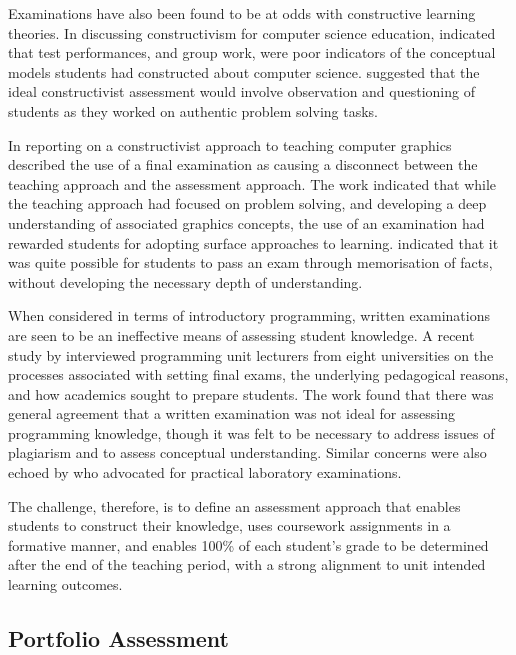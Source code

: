 Examinations have also been found to be at odds with constructive learning theories. In discussing constructivism for computer science education, \citet{BenAri:2001} indicated that test performances, and group work, were poor indicators of the conceptual models students had constructed about computer science. \citet{BenAri:2001} suggested that the ideal constructivist assessment would involve observation and questioning of students as they worked on authentic problem solving tasks.

In reporting on a constructivist approach to teaching computer graphics \citet{Taxen:2004} described the use of a final examination as causing a disconnect between the teaching approach and the assessment approach. The work indicated that while the teaching approach had focused on problem solving, and developing a deep understanding of associated graphics concepts, the use of an examination had rewarded students for adopting surface approaches to learning. \citet{Taxen:2004} indicated that it was quite possible for students to pass an exam through memorisation of facts, without developing the necessary depth of understanding.

When considered in terms of introductory programming, written examinations are seen to be an ineffective means of assessing student knowledge. A recent study by \citet{Sheard:2013} interviewed programming unit lecturers from eight universities on the processes associated with setting final exams, the underlying pedagogical reasons, and how academics sought to prepare students. The work found that there was general agreement that a written examination was not ideal for assessing programming knowledge, though it was felt to be necessary to address issues of plagiarism and to assess conceptual understanding. Similar concerns were also echoed by \citet{Bennedsen:2006} who advocated for practical laboratory examinations.

The challenge, therefore, is to define an assessment approach that enables students to construct their knowledge, uses coursework assignments in a formative manner, and enables 100\% of each student's grade to be determined after the end of the teaching period, with a strong alignment to unit intended learning outcomes.

\subsection{Portfolio Assessment} %
\label{sub:portfolio_assessment}

